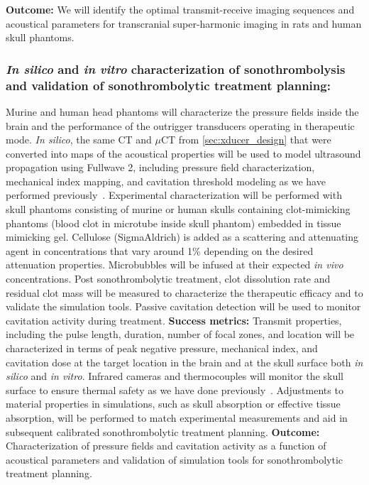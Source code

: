  \textbf{Outcome:} We will identify the optimal transmit-receive imaging sequences and acoustical parameters for transcranial super-harmonic imaging in rats and human skull phantoms.
 
\subsubsection{\textit{In silico} and \textit{in vitro} characterization of sonothrombolysis and validation of sonothrombolytic treatment planning: \label{sec:thermal_validation}} Murine and human head phantoms will characterize the pressure fields inside the brain and the performance of the outrigger transducers operating in therapeutic mode. \textit{In silico}, the same CT and $\mu$CT from \ref{sec:xducer_design} that were converted into maps of the acoustical properties will be used to model ultrasound propagation using Fullwave 2, including pressure field characterization, mechanical index mapping, and cavitation threshold modeling as we have performed previously~\cite{zhao2005two,pinton2011attenuation,pinton2011cavitation,pinton2009phase}. Experimental characterization will be performed with skull phantoms consisting of murine or human skulls containing clot-mimicking phantoms (blood clot in microtube inside skull phantom) embedded in tissue mimicking gel. Cellulose (SigmaAldrich) is added as a scattering and attenuating agent in concentrations that vary around 1\% depending on the desired attenuation properties.
Microbubbles will be infused at their expected \textit{in vivo} concentrations. Post sonothrombolytic treatment, clot dissolution rate and residual clot mass will be measured to characterize the therapeutic efficacy and to validate the simulation tools. Passive cavitation detection will be used to monitor cavitation activity during treatment.
\textbf{Success metrics:} Transmit properties, including the pulse length, duration, number of focal zones, and location will be characterized in terms of peak negative pressure, mechanical index, and cavitation dose at the target location in the brain and at the skull surface both \textit{in silico} and \textit{in vitro}. Infrared cameras and thermocouples will monitor the skull surface to ensure thermal safety as we have done previously~\cite{pinton2011attenuation}. Adjustments to material properties in simulations, such as skull absorption or effective tissue absorption, will be performed to match experimental measurements and aid in subsequent calibrated sonothrombolytic treatment planning. \textbf{Outcome:} Characterization of pressure fields and cavitation activity as a function of acoustical parameters and validation of simulation tools for sonothrombolytic treatment planning.

